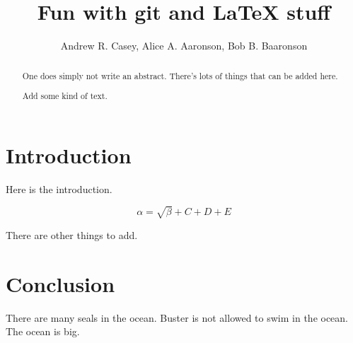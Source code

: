 \documentclass{article}
\begin{document}
\title{Fun with git and \LaTeX{} stuff}
\author{Andrew R. Casey, Alice A. Aaronson, Bob B. Baaronson}

\maketitle

\begin{abstract}
One does simply not write an abstract. There's lots of things that can be added here.

Add some kind of text.
\end{abstract}

\section{Introduction}
Here is the introduction.

\begin{equation}
    \label{simple_equation}
    \alpha = \sqrt{ \beta } + C + D + E
\end{equation}

There are other things to add.

\section{Conclusion}
There are many seals in the ocean. Buster is not allowed to swim in the ocean. The ocean is big.
\end{document}
